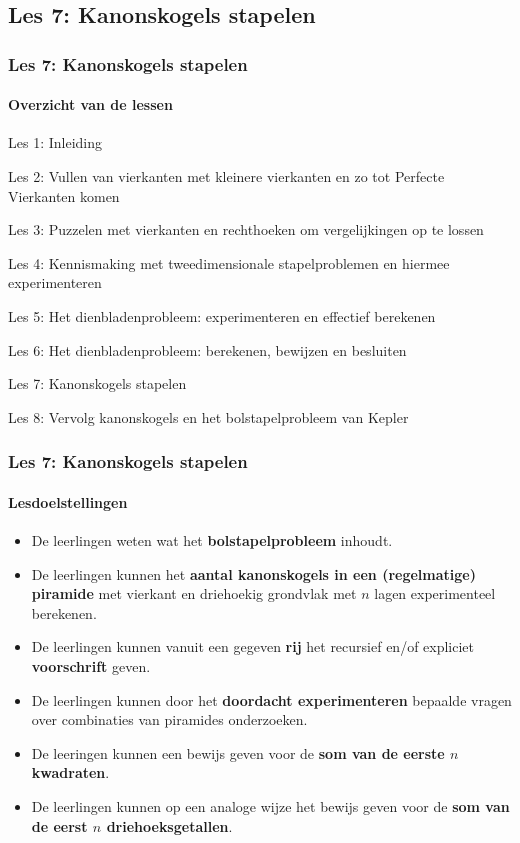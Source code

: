 \documentclass[dutch]{beamer}
\begin{document}
\subsection{Les 7: Kanonskogels stapelen}
\begin{frame}
\frametitle{Les 7: Kanonskogels stapelen}
\framesubtitle{Overzicht van de lessen}
\begin{list}{\quad}{}
\item Les 1: Inleiding
\item Les 2: Vullen van vierkanten met kleinere vierkanten en zo tot Perfecte Vierkanten komen
\item Les 3: Puzzelen met vierkanten en rechthoeken om vergelijkingen op te lossen
\item Les 4: Kennismaking met tweedimensionale stapelproblemen en hiermee experimenteren
\item Les 5: Het dienbladenprobleem: experimenteren en effectief berekenen
\item Les 6: Het dienbladenprobleem: berekenen, bewijzen en besluiten
\item {\color{blue}Les 7: Kanonskogels stapelen}
\item Les 8: Vervolg kanonskogels en het bolstapelprobleem van Kepler
\end{list}
\end{frame}

\begin{frame}
\frametitle{Les 7: Kanonskogels stapelen}
\framesubtitle{Lesdoelstellingen}
\begin{itemize}
\item De leerlingen weten wat het \textbf{bolstapelprobleem} inhoudt.
\item De leerlingen kunnen het \textbf{aantal kanonskogels in een (regelmatige) piramide} met vierkant en driehoekig grondvlak met $n$ lagen experimenteel berekenen.
\item De leerlingen kunnen vanuit een gegeven \textbf{rij} het recursief en/of expliciet \textbf{voorschrift} geven.
\item De leerlingen kunnen door het \textbf{doordacht experimenteren} bepaalde vragen over combinaties van piramides onderzoeken.
\item De leeringen kunnen een bewijs geven voor de \textbf{som van de eerste $n$ kwadraten}.
\item De leerlingen kunnen op een analoge wijze het bewijs geven voor de \textbf{som van de eerst $n$ driehoeksgetallen}.
\end{itemize}
\end{frame}
\end{document}
